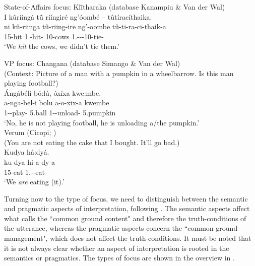 \documentclass[output=paper]{langscibook}
\begin{document}
\ea
State-of-Affairs focus: Kîîtharaka (database Kanampiu \& Van der Wal)\\
I kûrííngá t\'{û} rííngiré ng’óombé – tûtíracíthaika.\\
\gll
ni  kû-riinga  tû-riing-ire  ng’-oombe  tû-ti-ra-ci-thaik-a\\
\FOC{}  15-hit  1\PL.\SM{}-hit-\PFV{}  10-cows  1\PL.\SM-\NEG-\YPST{}-10\OM{}-tie-\FV{}\\
\glt ‘We {\itshape hit} the cows, we didn’t tie them.’

\z

\ea
VP focus: Changana (database Simango \& Van der Wal)\\
(Context: Picture of a man with a pumpkin in a wheelbarrow. Is this man playing football?)\\
Ángábélí bó:lú, óxíxa kwe:mbe.\\
\gll
a-nga-bel-i  bolu  a-o-xix-a  kwembe\\
1\SM-\NEG{}-play-\NEG{}  5.ball  1\SM-\EXCL{}-unload-\FV{}  5.pumpkin\\
\glt
‘No, he is not playing football, he is unloading a/the pumpkin.’\\


\z
\ea
Verum (Cicopi; \citealt[485]{KerrvanderWal2023})\\
(You are not eating the cake that I bought. It’ll go bad.)\\
Kudya hâ:dyá.\\
\gll
ku-dya  hi-a-dy-a\\
15-eat  1\PL.\SM{}-\DJ{}-eat-\FV{}\\
\glt
‘We {\itshape are} eating (it).’\\


\z

Turning now to the type of focus, we need to distinguish between the semantic and pragmatic aspects of interpretation, following \citet{Krifka2008,ZimmermannOnea2011}. The semantic aspects affect what \citet[249]{Krifka2008} calls the ``common ground content" and therefore the truth-conditions of the utterance, whereas the pragmatic aspects concern the ``common ground management", which does not affect the truth-conditions. It must be noted that it is not always clear whether an aspect of interpretation is rooted in the semantics or pragmatics. The types of focus are shown in the overview in .
\end{document}
